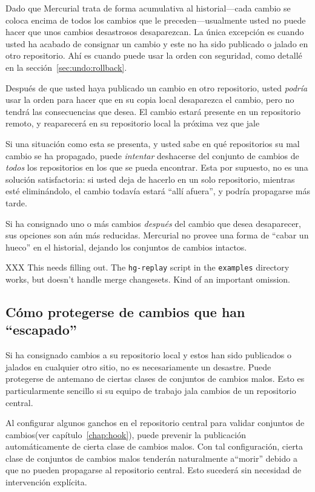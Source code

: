 Dado que Mercurial trata de forma acumulativa al historial---cada
cambio se coloca encima de todos los cambios que le
preceden---usualmente usted no puede hacer que unos cambios desastrosos
desaparezcan. La única excepción es cuando usted ha acabado de
consignar un cambio y este no ha sido publicado o jalado en otro
repositorio. Ahí es cuando puede usar la orden  con
seguridad, como detallé en la sección~\ref{sec:undo:rollback}.

Después de que usted haya publicado un cambio en otro repositorio, usted
\emph{podría} usar la orden  para hacer que en su copia
local desaparezca el cambio, pero no tendrá las consecuencias que
desea. El cambio estará presente en un repositorio remoto, y
reaparecerá en su repositorio local la próxima vez que jale

Si una situación como esta se presenta, y usted sabe en qué
repositorios su mal cambio se ha propagado, puede \emph{intentar}
deshacerse del conjunto de cambios de \emph{todos} los repositorios en
los que se pueda encontrar.  Esta por supuesto, no es una solución
satisfactoria: si usted deja de hacerlo en un solo repositorio,
mientras esté eliminándolo, el cambio todavía estará ``allí afuera'',
y podría propagarse más tarde.

Si ha consignado uno o más cambios \emph{después} del cambio que desea
desaparecer, sus opciones son aún más reducidas. Mercurial no provee
una forma de ``cabar un hueco'' en el historial, dejando los conjuntos
de cambios intactos.


XXX This needs filling out.  The \texttt{hg-replay} script in the
\texttt{examples} directory works, but doesn't handle merge
changesets.  Kind of an important omission.

\subsection{Cómo protegerse de cambios que han ``escapado''}

Si ha consignado cambios a su repositorio local y estos han sido
publicados o jalados en cualquier otro sitio, no es necesariamente un
desastre. Puede protegerse de antemano de ciertas clases de conjuntos
de cambios malos. Esto es particularmente sencillo si su equipo de
trabajo jala cambios de un repositorio central.

Al configurar algunos ganchos en el repositorio central para validar
conjuntos de cambios(ver capítulo~\ref{chap:hook}), puede prevenir la
publicación automáticamente de cierta clase de cambios malos.  Con tal
configuración, cierta clase de conjuntos de cambios malos tenderán
naturalmente a``morir'' debido a que no pueden propagarse al
repositorio central.  Esto sucederá sin necesidad de intervención
explícita.

